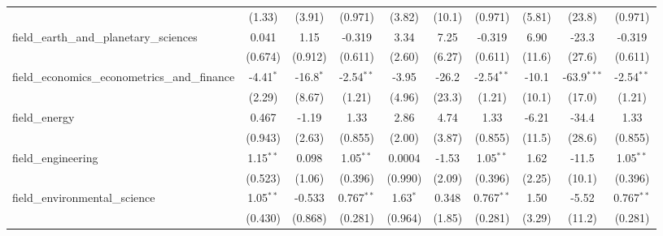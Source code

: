 \begin{tabular}{lccccccccc}
                                                               & (1.33)         & (3.91)        & (0.971)        & (3.82)         & (10.1)       & (0.971)        & (5.81)        & (23.8)        & (0.971)\\   
   field\_earth\_and\_planetary\_sciences                      & 0.041          & 1.15          & -0.319         & 3.34           & 7.25         & -0.319         & 6.90          & -23.3         & -0.319\\   
                                                               & (0.674)        & (0.912)       & (0.611)        & (2.60)         & (6.27)       & (0.611)        & (11.6)        & (27.6)        & (0.611)\\   
   field\_economics\_econometrics\_and\_finance                & -4.41$^{*}$    & -16.8$^{*}$   & -2.54$^{**}$   & -3.95          & -26.2        & -2.54$^{**}$   & -10.1         & -63.9$^{***}$ & -2.54$^{**}$\\   
                                                               & (2.29)         & (8.67)        & (1.21)         & (4.96)         & (23.3)       & (1.21)         & (10.1)        & (17.0)        & (1.21)\\   
   field\_energy                                               & 0.467          & -1.19         & 1.33           & 2.86           & 4.74         & 1.33           & -6.21         & -34.4         & 1.33\\   
                                                               & (0.943)        & (2.63)        & (0.855)        & (2.00)         & (3.87)       & (0.855)        & (11.5)        & (28.6)        & (0.855)\\   
   field\_engineering                                          & 1.15$^{**}$    & 0.098         & 1.05$^{**}$    & 0.0004         & -1.53        & 1.05$^{**}$    & 1.62          & -11.5         & 1.05$^{**}$\\   
                                                               & (0.523)        & (1.06)        & (0.396)        & (0.990)        & (2.09)       & (0.396)        & (2.25)        & (10.1)        & (0.396)\\   
   field\_environmental\_science                               & 1.05$^{**}$    & -0.533        & 0.767$^{**}$   & 1.63$^{*}$     & 0.348        & 0.767$^{**}$   & 1.50          & -5.52         & 0.767$^{**}$\\   
                                                               & (0.430)        & (0.868)       & (0.281)        & (0.964)        & (1.85)       & (0.281)        & (3.29)        & (11.2)        & (0.281)\\   

\end{tabular}
